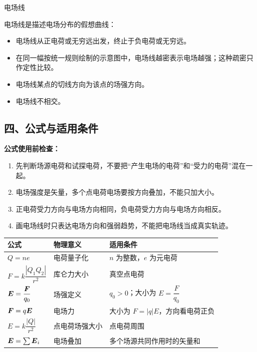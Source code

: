 \begin{conceptbox}{电场线}

电场线是描述电场分布的假想曲线：
\begin{itemize}
  \item 电场线从正电荷或无穷远出发，终止于负电荷或无穷远。
  \item 在同一幅按统一规则绘制的示意图中，电场线越密表示电场越强；这种疏密只作定性比较。
  \item 电场线某点的切线方向为该点的场强方向。
  \item 电场线不相交。
\end{itemize}

\begin{center}


\label{fig:electric-field-lines}

\vspace{0.5em}


\label{fig:uniform-field}
\end{center}

\end{conceptbox}

\begin{samepage}
\section*{四、公式与适用条件}

\textbf{公式使用前检查：}
\nopagebreak[4]
\begin{enumerate}
  \item 先判断场源电荷和试探电荷，不要把“产生电场的电荷”和“受力的电荷”混在一起。
  \item 电场强度是矢量，多个点电荷电场要按方向叠加，不能只加大小。
  \item 正电荷受力方向与电场方向相同，负电荷受力方向与电场方向相反。
  \item 画电场线时只表达电场方向和强弱趋势，不能把电场线当成真实轨迹。
\end{enumerate}
\end{samepage}

\begin{center}
\begin{tabular}{lll}
\toprule
公式 & 物理意义 & 适用条件 \\
\midrule
$Q=ne$ & 电荷量子化 & $n$ 为整数，$e$ 为元电荷 \\
$F = k\dfrac{|Q_1 Q_2|}{r^2}$ & 库仑力大小 & 真空点电荷 \\
$\boldsymbol{E} = \dfrac{\boldsymbol{F}}{q_0}$ & 场强定义 & $q_0>0$；大小为 $E=\dfrac{F}{q_0}$ \\
$\boldsymbol{F}=q\boldsymbol{E}$ & 电场力 & 大小为 $F=|q|E$，方向看电荷正负 \\
$E = k\dfrac{|Q|}{r^2}$ & 点电荷场强大小 & 点电荷周围 \\
$\boldsymbol{E} = \sum \boldsymbol{E}_i$ & 电场叠加 & 多个场源共同作用时的矢量和 \\
\bottomrule
\end{tabular}
\end{center}

